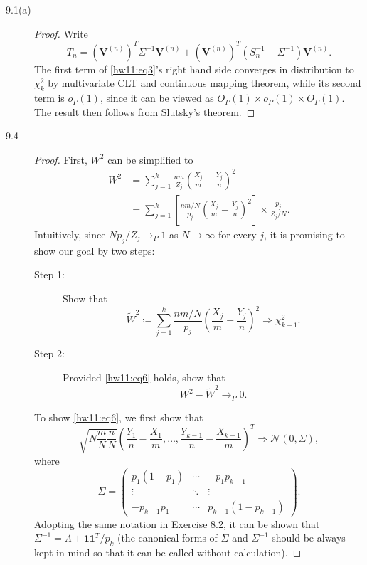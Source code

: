 \documentclass{article}
\newcommand{\gaussian}{\mathcal{N}}
\theoremstyle{definition}
\theoremstyle{plain}
\theoremstyle{remark}
\begin{document}
\begin{description}
\item[9.1(a)]
\begin{proof}
Write 
\begin{equation}\label{hw11:eq3}
T_n = (\bm{V}^{(n)})^T\Sigma^{-1}\bm{V}^{(n)} + (\bm{V}^{(n)})^T(S_n^{-1} - \Sigma^{-1})
\bm{V}^{(n)}.
\end{equation}
The first term of \eqref{hw11:eq3}'s right hand side converges in distribution to $\chi_k^2$ 
by multivariate CLT and continuous mapping theorem, while its second term is $o_P(1)$, since
it can be viewed as $O_P(1) \times o_P(1) \times O_P(1)$. The result then follows from 
Slutsky's theorem. 
\end{proof}

\item[9.4]
\begin{proof}
First, $W^2$ can be simplified to
\begin{align*}
W^2 & = \sum_{j = 1}^k \frac{nm}{Z_j}\left(\frac{X_j}{m} - \frac{Y_j}{n}\right)^2 \\
& = \sum_{j = 1}^k \left[\frac{nm/N}{p_j}\left(\frac{X_j}{m} - \frac{Y_j}{n}\right)^2
\right]\times \frac{p_j}{Z_j/N}.
\end{align*}
Intuitively, since $Np_j/Z_j \to_P 1$ as $N \to \infty$ for every $j$, it is promising
to show our goal by two steps:
\begin{description}
\item[Step 1:] Show that
\begin{equation}\label{hw11:eq6}
\tilde{W}^2 \coloneqq \sum_{j = 1}^k \frac{nm/N}{p_j}\left(\frac{X_j}{m} -
\frac{Y_j}{n}\right)^2 \Rightarrow \chi_{k - 1}^2.
\end{equation}
\item[Step 2:] Provided \eqref{hw11:eq6} holds, show that 
\begin{equation}\label{hw11:eq8}
W^2 - \tilde{W}^2 \to_P 0.
\end{equation}
\end{description}

To show \eqref{hw11:eq6}, we first show that
\begin{equation}\label{hw11:eq7}
    \sqrt{N\frac{m}{N}\frac{n}{N}}\left(\frac{Y_1}{n} - \frac{X_1}{m}, \ldots,
    \frac{Y_{k - 1}}{n} - \frac{X_{k - 1}}{m}\right)^T \Rightarrow \gaussian(0, \Sigma),
\end{equation}
where 
\begin{equation*}
    \Sigma = \begin{pmatrix}
    p_1(1 - p_1) & \cdots & -p_1p_{k - 1} \\
    \vdots & \ddots & \vdots \\
    -p_{k - 1}p_1 & \cdots & p_{k - 1}(1 - p_{k - 1})
    \end{pmatrix}.
\end{equation*}
Adopting the same notation in Exercise 8.2, it can be shown that $\Sigma^{-1} = \Lambda + \bm{1}\bm{1}^T/p_k$ (the canonical
forms of $\Sigma$ and $\Sigma^{-1}$ should be always kept in mind so that it can be
called without calculation).
 

\end{proof}
\end{description}
\end{document}
